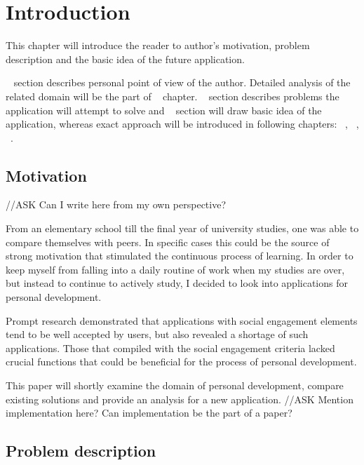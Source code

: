 

\chapter{Introduction}\label{ch:introduction}

This chapter will introduce the reader to author's motivation, problem description and the basic idea of the future application.

~ section describes personal point of view of the author.
Detailed analysis of the related domain will be the part of ~ chapter.
~ section describes problems the application will attempt to solve and
~ section will draw basic idea of the application, whereas exact approach
will be introduced in following chapters: ~, ~, ~.


\section{Motivation}\label{sec:introduction-motivation}

{\color{gray}//ASK Can I write here from my own perspective?}

From an elementary school till the final year of university studies, one was able to compare themselves with peers.
In specific cases this could be the source of strong motivation that stimulated the continuous process of learning.
In order to keep myself from falling into a daily routine of work when my studies are over,
but instead to continue to actively study, I decided to look into applications for personal development.

Prompt research demonstrated that applications with social engagement elements tend to be well accepted by users,
but also revealed a shortage of such applications.
Those that compiled with the social engagement criteria lacked crucial functions that could be beneficial for the process of personal development.

This paper will shortly examine the domain of personal development, compare existing solutions and provide an analysis for a
new application.
{\color{gray}//ASK Mention implementation here? Can implementation be the part of a paper?}


\section{Problem description}\label{sec:problem-description}

